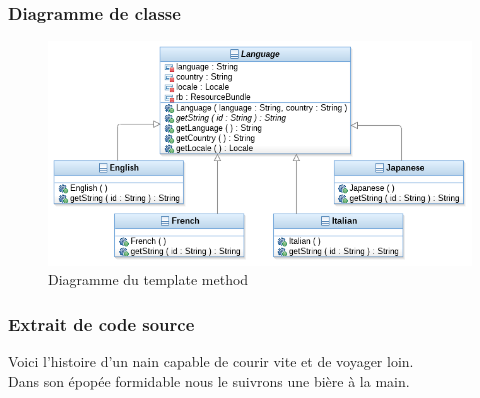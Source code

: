 \subsubsection{Diagramme de classe}

\begin{figure}[h]
	\centering
	\includegraphics[width=\textwidth]{ttmc_template_method.png}
	\caption{Diagramme du template method}
	\label{fig:diag_template_method}
\end{figure}

\subsubsection{Extrait de code source}
Voici l'histoire d'un nain capable de courir vite et de voyager loin.\\
Dans son épopée formidable nous le suivrons une bière à la main.\\


